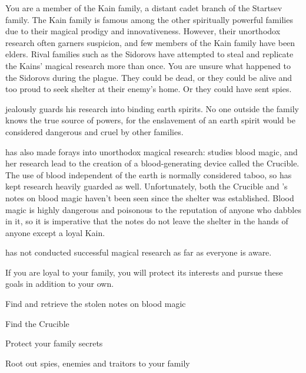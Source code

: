 \documentclass[blue]{Pestilence}
\begin{document}
\name{\bKain{}}

You are a member of the Kain family, a distant cadet branch of the Startsev family. The Kain family is famous among the other spiritually powerful families due to their magical prodigy and innovativeness. However, their unorthodox research often garners suspicion, and few members of the Kain family have been elders. Rival families such as the Sidorovs have attempted to steal and replicate the Kains' magical research more than once. You are unsure what happened to the Sidorovs during the plague. They could be dead, or they could be alive and too proud to seek shelter at their enemy's home. Or they could have sent spies.

\cElder{\intro} jealously guards his research into binding earth spirits. No one outside the family knows the true source of \cElder{\their} powers, for the enslavement of an earth spirit would be considered dangerous and cruel by other families.

\cRebel{\intro} has also made forays into unorthodox magical research: \cRebel{\they} studies blood magic, and her research lead to the creation of a blood-generating device called the Crucible. The use of blood independent of the earth is normally considered taboo, so \cRebel{\they} has kept \cRebel{\their} research heavily guarded as well. Unfortunately, both the Crucible and \cRebel{}'s notes on blood magic haven't been seen since the shelter was established. Blood magic is highly dangerous and poisonous to the reputation of anyone who dabbles in it, so it is imperative that the notes do not leave the shelter in the hands of anyone except a loyal Kain.

\cApprentice{\intro} has not conducted successful magical research as far as everyone is aware.

If you are loyal to your family, you will protect its interests and pursue these goals in addition to your own. 

\begin{itemz}[Goals]
	\item Find and retrieve the stolen notes on blood magic
	\item Find the Crucible
	\item Protect your family secrets
	\item Root out spies, enemies and traitors to your family
\end{itemz}
\end{document}
